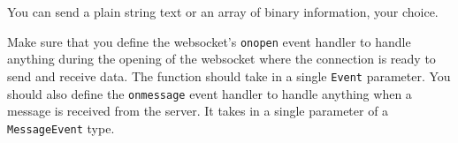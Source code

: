 \documentclass[../CMPUT-404-Notes.tex]{subfiles}
\begin{document}
You can send a plain string text or an array of binary information, your choice.

Make sure that you define the websocket's \texttt{onopen} event handler to handle anything during the opening of the websocket where the connection is ready to send and receive data. The function should take in a single \texttt{Event} parameter.
You should also define the \texttt{onmessage} event handler to handle anything when a message is received from the server. It takes in a single parameter of a \texttt{MessageEvent} type.
\end{document}
